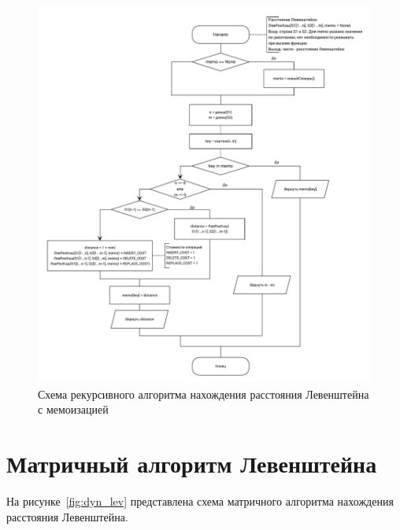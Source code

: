 \begin{figure}[H]
\centering
\includegraphics[width=\textwidth]{inc/img/recursive_cache_levenshtein.pdf}
\caption{Схема рекурсивного алгоритма нахождения расстояния Левенштейна с мемоизацией}
\label{fig:recur_lev_cache}
\end{figure}

\section{Матричный алгоритм Левенштейна}

На рисунке~\ref{fig:dyn_lev} представлена схема матричного алгоритма нахождения расстояния Левенштейна.

